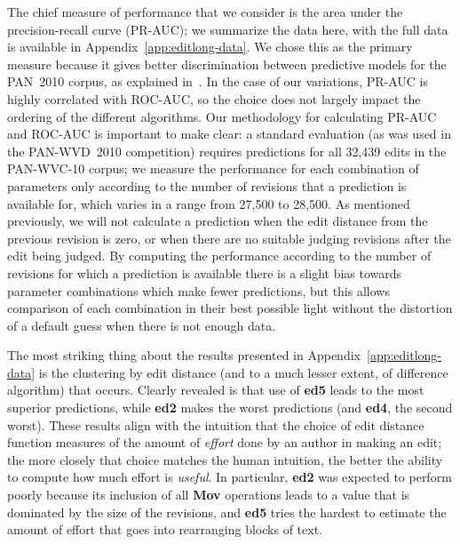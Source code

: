 The chief measure of performance that we consider is
the area under the precision-recall curve (PR-AUC);
we summarize the data here, with
the full data is available in Appendix~\ref{app:editlong-data}.
We chose this as the primary measure because it gives better
discrimination between predictive models for the PAN~2010
corpus, as explained in~\cite{Potthast2010b}.
In the case of our variations, PR-AUC is highly correlated
with ROC-AUC, so the choice does not largely impact the ordering
of the different algorithms.
Our methodology for calculating PR-AUC and ROC-AUC is important
to make clear: a standard evaluation (as was used in the
PAN-WVD~2010 competition) requires predictions for all 32,439
edits in the PAN-WVC-10 corpus; we measure the performance
for each combination of parameters only according to the number
of revisions that a prediction is available for, which varies
in a range from 27,500 to 28,500.
As mentioned previously, we will not calculate a prediction
when the edit distance from the previous revision is zero,
or when there are no suitable judging revisions after the
edit being judged.
By computing the performance according to the number of revisions
for which a prediction is available there is a slight bias towards
parameter combinations which make fewer predictions,
but this allows comparison of each combination in their best
possible light without the distortion of a default guess when
there is not enough data.

The most striking thing about the results presented
in Appendix~\ref{app:editlong-data} is the clustering
by edit distance (and to a much lesser extent, of difference
algorithm) that occurs.
Clearly revealed is that use of \textbf{ed5} leads to the most superior
predictions, while \textbf{ed2} makes the worst predictions
(and \textbf{ed4}, the second worst).
These results align with the intuition that the choice
of edit distance function measures of the amount
of \textit{effort} done by an author in making an edit;
the more closely that choice matches the human intuition,
the better the ability to compute how much effort is \textit{useful}.
In particular, \textbf{ed2} was expected to perform poorly
because its inclusion of all \textbf{Mov} operations leads
to a value that is dominated by the size of the revisions,
and \textbf{ed5} tries the hardest to estimate the amount of
effort that goes into rearranging blocks of text.


